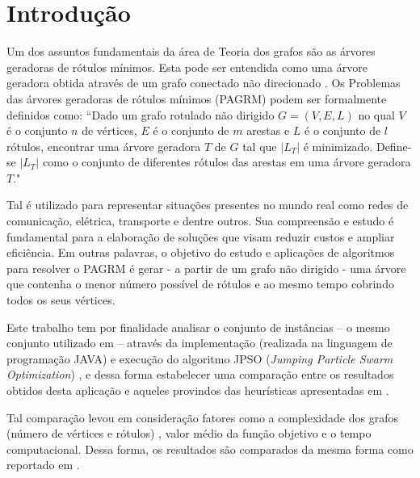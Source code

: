 \documentclass{sig-alternate-05-2015}
\begin{document}


%
%

%
%
\printccsdesc



\section{Introdução}

Um dos assuntos fundamentais da área de Teoria dos grafos são as árvores geradoras de rótulos mínimos. Esta pode ser entendida como uma árvore geradora obtida através de um grafo conectado não direcionado \cite{}. Os Problemas das árvores geradoras de rótulos mínimos (PAGRM)  podem ser formalmente definidos como: ``Dado um grafo rotulado não dirigido $G = (V,E,L) $ no qual $ V $ é o conjunto $ n$ de vértices, $E$ é o conjunto de $m$ arestas e $L$ é o conjunto de $l$ rótulos, encontrar uma árvore geradora $T$ de $G$ tal que $|L_{T}|$ é minimizado. Define-se  $|L_{T}|$ como o conjunto de diferentes rótulos das arestas em uma árvore geradora $T$."

Tal é utilizado para representar situações presentes no mundo real como redes de comunicação, elétrica, transporte e dentre outros. Sua compreensão e estudo é fundamental para a elaboração de soluções que visam reduzir custos e ampliar eficiência. Em outras palavras, o objetivo do estudo e aplicações de algoritmos para resolver o PAGRM é gerar - a partir de um grafo não dirigido - uma árvore que contenha o menor número possível de rótulos e ao mesmo tempo cobrindo todos os seus vértices.

Este trabalho tem por finalidade analisar o conjunto de instâncias  -- o mesmo conjunto utilizado em \cite{} -- através da implementação (realizada na linguagem de programação JAVA) e execução do algoritmo JPSO (\textit{Jumping Particle Swarm Optimization}) \cite{}, e dessa forma estabelecer uma comparação entre os resultados obtidos desta aplicação e aqueles provindos das heurísticas apresentadas em \cite{}. 

Tal comparação levou em consideração fatores como a complexidade dos grafos (número de vértices e rótulos) , valor médio da função objetivo e o tempo computacional. Dessa forma, os resultados são comparados da mesma forma como reportado em \cite{}.
\end{document}
